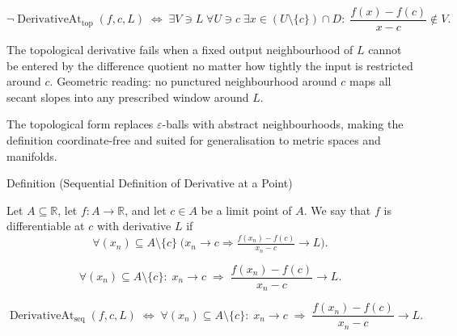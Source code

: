 \begin{remark*}
\[
\neg\operatorname{DerivativeAt}_{\mathrm{top}}(f,c,L)
\;\Longleftrightarrow\;
\exists V \ni L\;\forall U \ni c\;\exists x \in (U\setminus\{c\})\cap D:\;
\frac{f(x)-f(c)}{x-c}\notin V.
\]
\end{remark*}

\begin{remark*}
The topological derivative fails when a fixed output neighbourhood of $L$ cannot be entered by the difference quotient no matter how tightly the input is restricted around $c$. Geometric reading: no punctured neighbourhood around $c$ maps all secant slopes into any prescribed window around $L$.
\end{remark*}

\begin{remark*}[Interpretation]
The topological form replaces $\varepsilon$-balls with abstract neighbourhoods, making the definition coordinate-free and suited for generalisation to metric spaces and manifolds.
\end{remark*}

\NoLocalDependencies


\begin{definitionbox}{Definition (Sequential Definition of Derivative at a Point)}
\begin{definition}
\label{def:sequential-definition-of-derivative-at-a-point}
Let $A \subseteq \mathbb{R}$, let $f : A \to \mathbb{R}$, and let $c \in A$ be a limit point of $A$. We say that $f$ is differentiable at $c$ with derivative $L$ if
\[
\forall (x_n) \subseteq A \setminus \{c\}\;
\bigl(x_n \to c \Rightarrow \tfrac{f(x_n)-f(c)}{x_n-c} \to L\bigr).
\]
\end{definition}
\end{definitionbox}

\begin{remark*}
\[
\forall (x_n) \subseteq A \setminus \{c\}:\;
x_n \to c \;\Rightarrow\; \frac{f(x_n)-f(c)}{x_n-c} \to L.
\]
\end{remark*}

\begin{remark*}
\[
\operatorname{DerivativeAt}_{\mathrm{seq}}(f,c,L)
\;\Longleftrightarrow\;
\forall (x_n)\subseteq A\setminus\{c\}:\;
x_n\to c \;\Rightarrow\; \frac{f(x_n)-f(c)}{x_n-c}\to L.
\]
\end{remark*}

